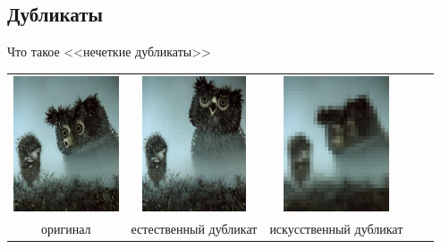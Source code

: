 
\subsection{Дубликаты}


%

\begin{frame}{Что такое <<нечеткие дубликаты>>}
    \begin{center}
        \begin{tabular}{ccccc}
            \includegraphics[height=4cm]{img/video/near-dublicate-1-1.png}
            &
            \includegraphics[height=4cm]{img/video/near-dublicate-1-2.png}
            &
            \includegraphics[height=4cm]{img/video/near-dublicate-1-3.png}
            \\
            {\small оригинал}
            &
            {\footnotesize естественный дубликат}
            &
            {\footnotesize искусственный дубликат}
            \\
        \end{tabular}
    \end{center}
\end{frame}
